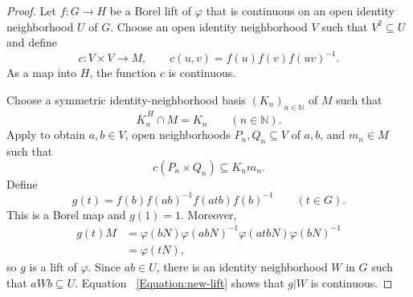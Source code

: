 \documentclass[12pt]{amsart}
\theoremstyle{definition}
\begin{document}
\begin{proof}
Let $f:G\rightarrow H$ be a Borel lift of $\varphi $ that is continuous on
an open identity neighborhood $U$ of $G$. Choose an open identity
neighborhood $V$ such that $V^{2}\subseteq U$ and define 
\begin{equation*}
c:V\times V\longrightarrow M,\qquad c(u,v)=f(u)f(v)f(uv)^{-1}.
\end{equation*}%
As a map into $H$, the function $c$ is continuous.

Choose a symmetric identity-neighborhood basis $(K_{n})_{n\in \mathbb{N}}$
of $M$ such that 
\begin{equation*}
\overline{K}_{n}^{\,H}\cap M=K_{n}\qquad (n\in \mathbb{N}).
\end{equation*}%
Apply  to obtain $a,b\in V$, open
neighborhoods $P_{n},Q_{n}\subseteq V$ of $a,b$, and $m_{n}\in M$ such that 
\begin{equation}
c(P_{n}\times Q_{n})\subseteq K_{n}m_{n}.  \label{Equation:one-coset}
\end{equation}%
Define 
\begin{equation}
g(t)=f(b)f(ab)^{-1}f(atb)f(b)^{-1}\qquad (t\in G).  \label{Equation:new-lift}
\end{equation}%
This is a Borel map and $g(1)=1$. Moreover, 
\begin{align*}
g(t)M& =\varphi (bN)\varphi (abN)^{-1}\varphi (atbN)\varphi (bN)^{-1} \\
& =\varphi (tN),
\end{align*}%
so $g$ is a lift of $\varphi $. Since $ab\in U$, there is an identity
neighborhood $W$ in $G$ such that $aWb\subseteq U$. Equation~%
\eqref{Equation:new-lift} shows that $g|W$ is continuous.


\end{proof}
\end{document}
